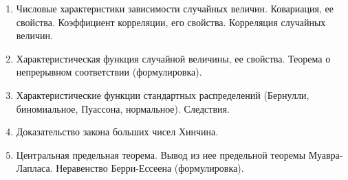 \begin{enumerate}
    \item Числовые характеристики зависимости случайных величин. Ковариация, ее свойства. Коэффициент корреляции, его свойства. Корреляция случайных величин.
    \item Характеристическая функция случайной величины, ее свойства. Теорема о непрерывном соответствии (формулировка).
    \item Характеристические функции стандартных распределений (Бернулли, биномиальное, Пуассона, нормальное). Следствия.
    \item Доказательство закона больших чисел Хинчина.
    \item Центральная предельная теорема. Вывод из нее предельной теоремы Муавра-Лапласа. Неравенство Берри-Ессеена (формулировка). 
\end{enumerate}
